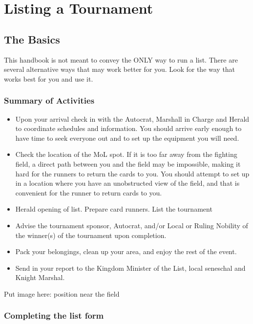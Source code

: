 \documentclass{article}
\begin{document}
\section{Listing a Tournament}
\subsection{The Basics}
This handbook is not meant to convey the ONLY way to run a list. There are several alternative ways that
may work better for you. Look for the way that works best for you and use it.
\subsubsection{Summary of Activities}
\begin{itemize}
\item Upon your arrival check in with the Autocrat, Marshall in Charge and Herald to coordinate
schedules and information. You should arrive early enough to have time to seek everyone out and to
set up the equipment you will need.

\item Check the location of the MoL spot. If it is too far away from the fighting field, a direct path
between you and the field may be impossible, making it hard for the runners to return the cards to
you. You should attempt to set up in a location where you have an unobstructed view of the field,
and that is convenient for the runner to return cards to you.

\item Herald opening of list. Prepare card runners. List the tournament

\item Advise the tournament sponsor, Autocrat, and/or Local or Ruling Nobility of the winner(s) of the
tournament upon completion.

\item Pack your belongings, clean up your area, and enjoy the rest of the event.

\item Send in your report to the Kingdom Minister of the List, local seneschal and Knight Marshal.
\end{itemize}

Put image here: position near the field



\subsubsection{Completing the list form}
\end{document}

